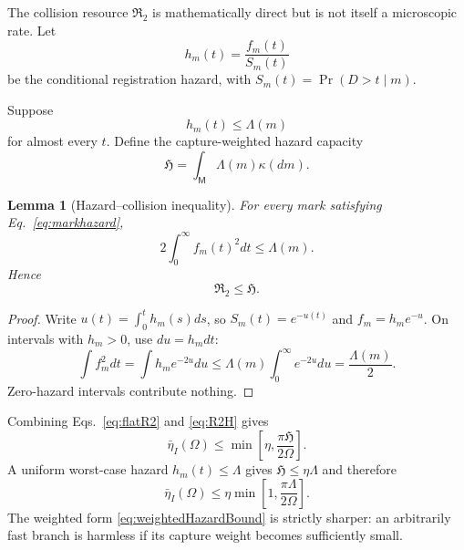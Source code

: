 \documentclass[aps,prapplied,preprint,nofootinbib]{revtex4-2}
\newtheorem{lemma}{Lemma}
\newcommand{\Rtwo}{\mathfrak R_2}
\newcommand{\Hcap}{\mathfrak H}
\newcommand{\M}{\mathsf M}
\begin{document}
The collision resource $\Rtwo$ is mathematically direct but is not itself a microscopic rate.  Let
\begin{equation}
h_m(t)=\frac{f_m(t)}{S_m(t)}
\end{equation}
be the conditional registration hazard, with $S_m(t)=\Pr(D>t\mid m)$.

Suppose
\begin{equation}
h_m(t)\le\Lambda(m)
\label{eq:markhazard}
\end{equation}
for almost every $t$.  Define the capture-weighted hazard capacity
\begin{equation}
\boxed{
\Hcap=\int_{\M}\Lambda(m)\kappa(dm).}
\label{eq:Hcap}
\end{equation}

\begin{lemma}[Hazard--collision inequality]
For every mark satisfying Eq.~\eqref{eq:markhazard},
\begin{equation}
2\int_0^\infty f_m(t)^2dt\le\Lambda(m).
\label{eq:hazardL2}
\end{equation}
Hence
\begin{equation}
\boxed{\Rtwo\le\Hcap.}
\label{eq:R2H}
\end{equation}
\end{lemma}

\begin{proof}
Write $u(t)=\int_0^th_m(s)ds$, so $S_m(t)=e^{-u(t)}$ and $f_m=h_me^{-u}$.  On intervals with $h_m>0$, use $du=h_mdt$:
\begin{equation}
\int f_m^2dt
=\int h_m e^{-2u}du
\le\Lambda(m)\int_0^\infty e^{-2u}du
=\frac{\Lambda(m)}{2}.
\end{equation}
Zero-hazard intervals contribute nothing.
\end{proof}

Combining Eqs.~\eqref{eq:flatR2} and \eqref{eq:R2H} gives
\begin{equation}
\boxed{
\bar\eta_I(\Omega)
\le
\min\left[\eta,\frac{\pi\Hcap}{2\Omega}\right].}
\label{eq:weightedHazardBound}
\end{equation}
A uniform worst-case hazard $h_m(t)\le\Lambda$ gives $\Hcap\le\eta\Lambda$ and therefore
\begin{equation}
\bar\eta_I(\Omega)
\le\eta\min\left[1,\frac{\pi\Lambda}{2\Omega}\right].
\label{eq:uniformHazard}
\end{equation}
The weighted form \eqref{eq:weightedHazardBound} is strictly sharper: an arbitrarily fast branch is harmless if its capture weight becomes sufficiently small.
\end{document}
